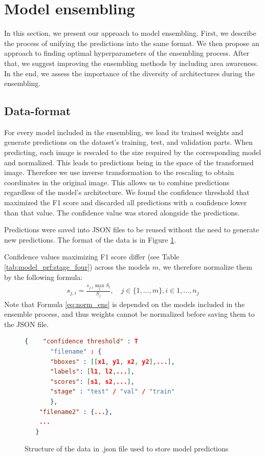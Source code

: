 \section{Model ensembling}
\label{sec:model_ensemling}
In this section, we present our approach to model ensembling. First, we describe the process of unifying the predictions into the same format. We then propose an approach to finding optimal hyperparameters of the ensembling process. After that, we suggest improving the ensembling methods by including area awareness. In the end, we assess the importance of the diversity of architectures during the ensembling.

\subsection{Data-format}
For every model included in the ensembling, we load its trained weights and generate predictions on the dataset's training, test, and validation parts. When predicting, each image is rescaled to the size required by the corresponding model and normalized. This leads to predictions being in the space of the transformed image. Therefore we use inverse transformation to the rescaling to obtain coordinates in the original image. This allows us to combine predictions regardless of the model's architecture. We found the confidence threshold that maximized the F1 score and discarded all predictions with a confidence lower than that value. The confidence value was stored alongside the predictions.

Predictions were saved into JSON files to be reused without the need to generate new predictions. The format of the data is in Figure \ref{fig:predictions_json}.

Confidence values maximizing F1 score differ (see Table \ref{tab:model_prf:stage_four}) across the models $m$, we therefore normalize them by the following formula:
\begin{align}
    s_{j,i} = \frac{s_{j,i} \max_l S_l}{  S_j}, \quad j \in \{ 1,...,m\}, i \in {1,...,n_j}
    \label{eq:norm_ens}
\end{align}
Note that Formula \ref{eq:norm_ens} is depended on the models included in the ensemble process, and thus weights cannot be normalized before saving them to the JSON file.

\begin{figure}[h]
    \centering
    \begin{lstlisting}[language=json, numbers=none]
   {    "confidence threshold" : T
       "filename" : {
       "bboxes" : [[x1, y1, x2, y2],...],
       "labels": [l1, l2,...],
       "scores": [s1, s2,...],
       "stage" : "test" / "val" / "train"
       },
    "filename2" : {...},
    ...
   }
\end{lstlisting}
    \caption{Structure of the data in .json file used to store model predictions}
    \label{fig:predictions_json}
\end{figure}

